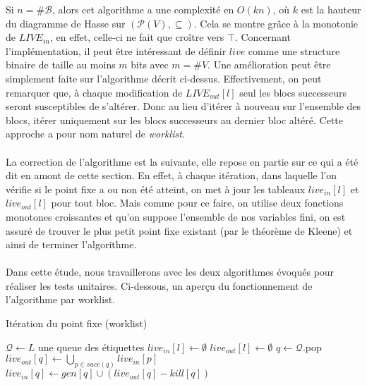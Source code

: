 \documentclass[a4paper, 12pt]{article}
\begin{document}
Si $n = \#\mathcal{B}$, alors cet algorithme a une complexité en $O(kn)$, où $k$ est la hauteur du diagramme
de Hasse sur $(\mathcal{P}(V), \subseteq)$. Cela se montre grâce à la monotonie de $LIVE_{in}$, en effet,
celle-ci ne fait que croître vers $\top$.
Concernant l'implémentation, il peut être intéressant de définir $live$ comme une structure binaire de taille au
moins $m$ bits avec $m = \#V$.
Une amélioration peut être simplement faite sur l'algorithme décrit ci-dessus. Effectivement, on peut remarquer que,
à chaque modification de $LIVE_{out}[l]$ seul les blocs successeurs seront susceptibles de s'altérer. Donc
au lieu d'itérer à nouveau sur l'ensemble des blocs, itérer uniquement sur les blocs successeurs au dernier
bloc altéré. Cette approche a pour nom naturel de \textit{worklist}.
\\
\\
La correction de l'algorithme est la suivante, elle repose en partie sur ce qui a été dit en amont de cette section.
En effet, à chaque itération, dans laquelle l'on vérifie si le point fixe a ou non été atteint, on met à jour les
tableaux $live_{in}[l]$ et $live_{out}[l]$ pour tout bloc. Mais comme pour ce faire, on utilise deux fonctions monotones croissantes et qu'on suppose
l'ensemble de nos variables fini, on est assuré de trouver le plus petit point fixe existant (par le théorème de Kleene) et ainsi de terminer l'algorithme.
\\
\\
Dans cette étude, nous travaillerons avec les deux algorithmes évoqués pour réaliser les tests unitaires. Ci-dessous, un aperçu du fonctionnement
de l'algorithme par worklist.

\begin{algorithm}
	\caption{Itération du point fixe (worklist)}
	\begin{algorithmic}
		\State $\mathcal{Q} \leftarrow L$ une queue des étiquettes
		\State $live_{in}[l] \leftarrow \emptyset$
		\State $live_{out}[l] \leftarrow \emptyset$
		\EndFor
		\State $q \leftarrow \mathcal{Q}$.pop
		\State $live_{out}[q] \leftarrow \bigcup\limits_{p\in succ(q)} live_{in}[p]$
		\State $live_{in}[q] \leftarrow gen[q] \cup (live_{out}[q] - kill[q])$
		\EndWhile
	\end{algorithmic}
\end{algorithm}
\end{document}
